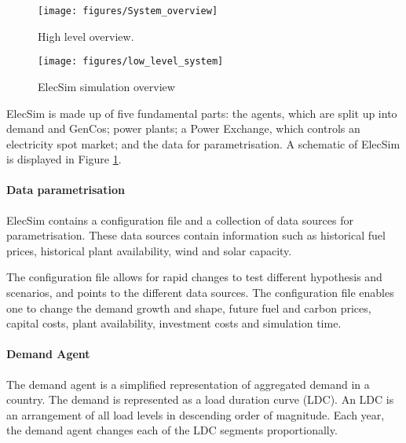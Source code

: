 
\begin{figure}
	\centering
	\texttt{[image: figures/System\_overview]}
	\caption{High level overview.}
	\label{fig:systemoverview}
	\vskip -6.9mm
\end{figure}

\begin{figure*}
	\centering
	\texttt{[image: figures/low\_level\_system]}
	\caption{ElecSim simulation overview}
	\label{fig:lowlevelsystem}
\end{figure*}

ElecSim is made up of five fundamental parts: the agents, which are split up into demand and GenCos; power plants; a Power Exchange, which controls an electricity spot market; and the data for parametrisation. A schematic of ElecSim is displayed in Figure \ref{fig:systemoverview}.

\paragraph{Data parametrisation} ElecSim contains a configuration file and a collection of data sources for parametrisation. These data sources contain information such as historical fuel prices, historical plant availability, wind and solar capacity.

The configuration file allows for rapid changes to test different hypothesis and scenarios, and points to the different data sources. The configuration file enables one to change the demand growth and shape, future fuel and carbon prices, capital costs, plant availability, investment costs and simulation time.

\paragraph{Demand Agent}
The demand agent is a simplified representation of aggregated demand in a country. The demand is represented as a load duration curve (LDC).  An LDC is an arrangement of all load levels in descending order of magnitude.  Each year, the demand agent changes each of the LDC segments proportionally.


